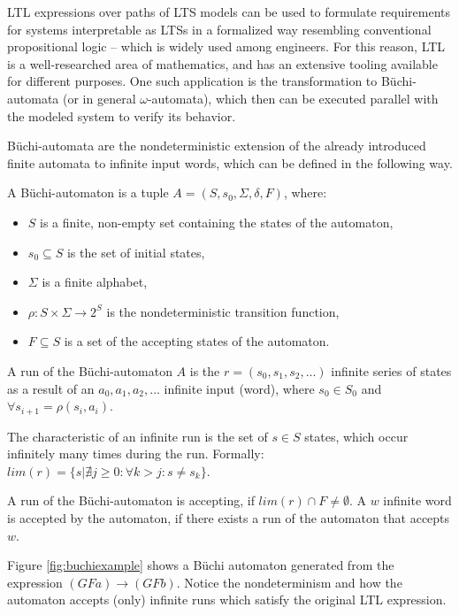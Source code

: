 LTL expressions over paths of LTS models can be used to formulate requirements for systems interpretable as LTSs in a formalized way resembling conventional propositional logic -- which is widely used among engineers. For this reason, LTL is a well-researched area of mathematics, and has an extensive tooling available for different purposes. One such application is the transformation to Büchi-automata (or in general $\omega$-automata), which then can be executed parallel with the modeled system to verify its behavior.

Büchi-automata are the nondeterministic extension of the already introduced finite automata to infinite input words, which can be defined in the following way.

\begin{definition}
	A Büchi-automaton is a tuple $A=(S, s_0, \Sigma, \delta, F)$, where:
	\begin{itemize}
		\item $S$ is a finite, non-empty set containing the states of the automaton, 
		\item $s_0 \subseteq S$ is the set of initial states,
		\item $\Sigma$ is a finite alphabet,
		\item $\rho : S \times \Sigma \rightarrow 2^S$ is the nondeterministic transition function,
		\item $F \subseteq S$ is a set of the accepting states of the automaton.
	\end{itemize}

	A run of the Büchi-automaton $A$ is the $r=(s_0,s_1,s_2,...)$ infinite series of states as a result of an $a_0, a_1, a_2, ...$ infinite input (word), where $s_0 \in S_0$ and $\forall s_{i+1}=\rho(s_i, a_i)$. 
	
	The characteristic of an infinite run is the set of $s \in S$ states, which occur infinitely many times during the run. Formally: $lim(r) = \{s | \nexists j \geq 0 : \forall k > j : s \neq s_k\}$. 
	
	A run of the Büchi-automaton is accepting, if $lim(r) \cap F \neq \emptyset$. A $ w $ infinite word is accepted by the automaton, if there exists a run of the automaton that accepts $w$.
\end{definition}

\begin{example}
	\label{ex:buchiexample}
	Figure \ref{fig:buchiexample} shows a Büchi automaton generated from the expression $(G F a) \rightarrow (G F b)$. Notice the nondeterminism and how the automaton accepts (only) infinite runs which satisfy the original LTL expression. 
\end{example}

